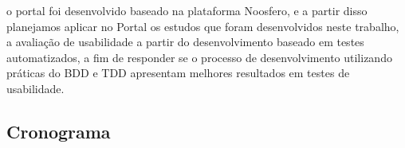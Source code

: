 o portal foi desenvolvido baseado na plataforma Noosfero, e a partir disso planejamos aplicar no Portal os estudos que foram desenvolvidos neste trabalho, a avaliação de usabilidade a partir do desenvolvimento baseado em testes automatizados, a fim de responder se o processo de desenvolvimento utilizando práticas do BDD e TDD apresentam melhores resultados em testes de usabilidade.

\subsection{Cronograma}
